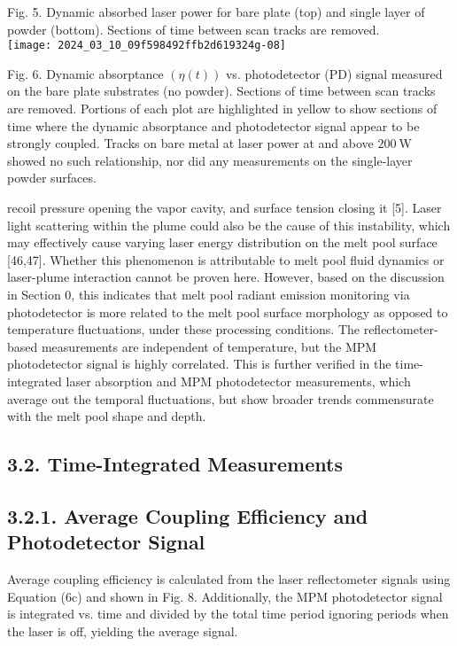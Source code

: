 \documentclass[10pt]{article}
\begin{document}
Fig. 5. Dynamic absorbed laser power for bare plate (top) and single layer of powder (bottom). Sections of time between scan tracks are removed.\\
\texttt{[image: 2024\_03\_10\_09f598492ffb2d619324g-08]}

Fig. 6. Dynamic absorptance $(\eta(t))$ vs. photodetector (PD) signal measured on the bare plate substrates (no powder). Sections of time between scan tracks are removed. Portions of each plot are highlighted in yellow to show sections of time where the dynamic absorptance and photodetector signal appear to be strongly coupled. Tracks on bare metal at laser power at and above $200 \mathrm{~W}$ showed no such relationship, nor did any measurements on the single-layer powder surfaces.

recoil pressure opening the vapor cavity, and surface tension closing it [5]. Laser light scattering within the plume could also be the cause of this instability, which may effectively cause varying laser energy distribution on the melt pool surface [46,47]. Whether this phenomenon is attributable to melt pool fluid dynamics or laser-plume interaction cannot be proven here. However, based on the discussion in Section 0, this indicates that melt pool radiant emission monitoring via photodetector is more related to the melt pool surface morphology as opposed to temperature fluctuations, under these processing conditions. The reflectometer-based measurements are independent of temperature, but the MPM photodetector signal is highly correlated. This is further verified in the time-integrated laser absorption and MPM photodetector measurements, which average out the temporal fluctuations, but show broader trends commensurate with the melt pool shape and depth.

\subsection*{3.2. Time-Integrated Measurements}
\subsection*{3.2.1. Average Coupling Efficiency and Photodetector Signal}
Average coupling efficiency is calculated from the laser reflectometer signals using Equation (6c) and shown in Fig. 8. Additionally, the MPM photodetector signal is integrated vs. time and divided by the total time period ignoring periods when the laser is off, yielding the average signal.
\end{document}
